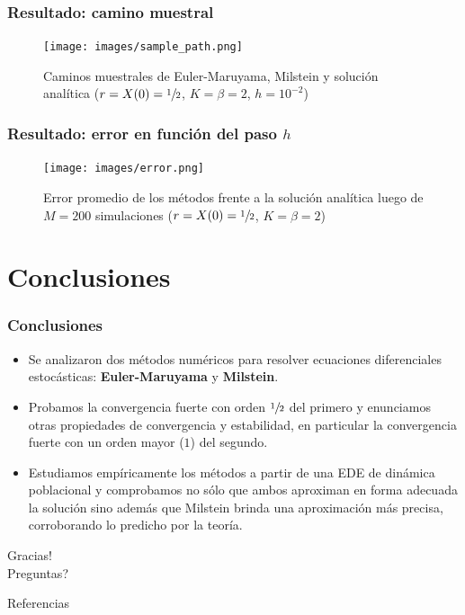 \documentclass[10pt]{beamer}
\begin{document}
\frame
{
    \frametitle{Resultado: camino muestral}

    \begin{center}
    \begin{figure}[h!]
    \centerline{
        \texttt{[image: images/sample\_path.png]}
    }
        \caption{Caminos muestrales de Euler-Maruyama, Milstein y solución analítica ($r = X(0) = \sfrac{1}{2}$, $K = \beta = 2$, $h = 10^{-2}$)}
    \end{figure}
    \end{center}
}

\frame
{
    \frametitle{Resultado: error en función del paso $h$}

    \begin{center}
    \begin{figure}[h!]
    \centerline{
        \texttt{[image: images/error.png]}
    }
        \caption{Error promedio de los métodos frente a la solución analítica luego de $M = 200$ simulaciones ($r = X(0) = \sfrac{1}{2}$, $K = \beta = 2$)}
    \end{figure}
    \end{center}
}

\section{Conclusiones}

\frame
{
    \frametitle{Conclusiones}

    \begin{itemize}
        \item Se analizaron dos métodos numéricos para resolver ecuaciones diferenciales estocásticas: 
        \textbf{Euler-Maruyama} y \textbf{Milstein}.
        \item Probamos la convergencia fuerte con orden $\sfrac{1}{2}$ del primero y enunciamos
        otras propiedades de convergencia y estabilidad, en particular 
        la convergencia fuerte con un orden mayor ($1$) del segundo.
        \item Estudiamos empíricamente los métodos a partir de una EDE de dinámica poblacional
        y comprobamos no sólo que ambos aproximan en forma adecuada la solución sino además que
        Milstein brinda una aproximación más precisa, corroborando lo predicho por la teoría. 
    \end{itemize}
}



\begin{frame}[standout]
  Gracias!\\
  
  Preguntas?
\end{frame}

\nocite{*}
\begin{frame}[allowframebreaks]{Referencias}
  
  
\end{frame}
\end{document}
